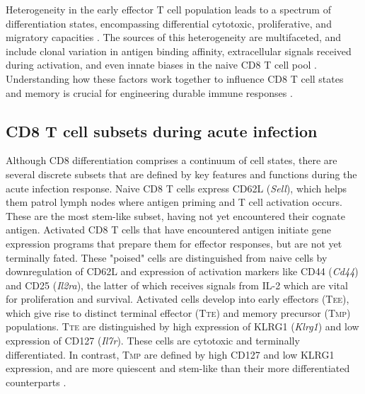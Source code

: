 Heterogeneity in the early effector T cell population leads to a spectrum of differentiation states, encompassing differential cytotoxic, proliferative, and migratory capacities \citep{bestTranscriptionalInsightsCD82013, sarkarFunctionalGenomicProfiling2008, milnerHeterogenousPopulationsTissueResident2020, kaechHeterogeneityCellfateDecisions2007}. The sources of this heterogeneity are multifaceted, and include clonal variation in antigen binding affinity, extracellular signals received during activation, and even innate biases in the naive CD8 T cell pool \citep{yoonCellCycleTime2010, martinetTypeInterferonsRegulate2015, wherryViralPersistenceAlters2003, kaechTranscriptionalControlEffector2012}. Understanding how these factors work together to influence CD8 T cell states and memory is crucial for engineering durable immune responses \citep{ellisGeneticEngineeringCells2021, kaechEffectorMemoryTcell2002}.

\subsection{CD8 T cell subsets during acute infection}

Although CD8 differentiation comprises a continuum of cell states, there are several discrete subsets that are defined by key features and functions during the acute infection response. Naive CD8 T cells express CD62L (\textit{Sell}), which helps them patrol lymph nodes where antigen priming and T cell activation occurs. These are the most stem-like subset, having not yet encountered their cognate antigen. Activated CD8 T cells that have encountered antigen initiate gene expression programs that prepare them for effector responses, but are not yet terminally fated. These "poised" cells are distinguished from naive cells by downregulation of CD62L and expression of activation markers like CD44 (\textit{Cd44}) and CD25 (\textit{Il2ra}), the latter of which receives signals from IL-2 which are vital for proliferation and survival. Activated cells develop into early effectors (T\textsc{ee}), which give rise to distinct terminal effector (T\textsc{te}) and memory precursor (T\textsc{mp}) populations. T\textsc{te} are distinguished by high expression of KLRG1 (\textit{Klrg1}) and low expression of CD127 (\textit{Il7r}). These cells are cytotoxic and terminally differentiated. In contrast, T\textsc{mp} are defined by high CD127 and low KLRG1 expression, and are more quiescent and stem-like than their more differentiated counterparts \citep{yuzefpolskiyEarlyCD8Tcell2015, kaliaProlongedInterleukin2RaExpression2010, joshiInflammationDirectsMemory2007}.

